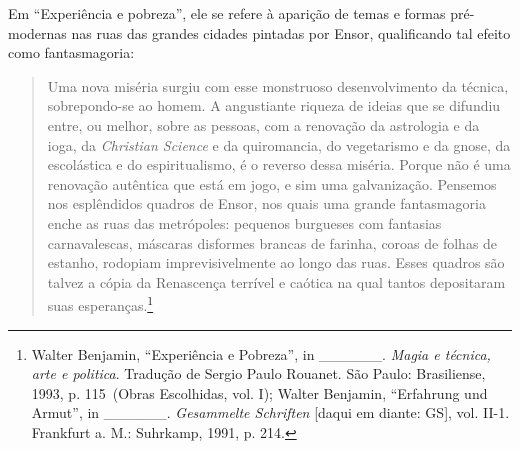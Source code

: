 Em ``Experiência e pobreza'', ele se refere à aparição de temas e formas
pré-modernas nas ruas das grandes cidades pintadas por Ensor,
qualificando tal efeito como fantasmagoria:

\begin{quote}
Uma nova miséria surgiu com esse monstruoso desenvolvimento da técnica,
sobrepondo-se ao homem. A angustiante riqueza de ideias que se difundiu
entre, ou melhor, sobre as pessoas, com a renovação da astrologia e da
ioga, da \emph{Christian Science} e da quiromancia, do vegetarismo e da
gnose, da escolástica e do espiritualismo, é o reverso dessa miséria.
Porque não é uma renovação autêntica que está em jogo, e sim uma
galvanização. Pensemos nos esplêndidos quadros de Ensor, nos quais uma
grande fantasmagoria enche as ruas das metrópoles: pequenos burgueses
com fantasias carnavalescas, máscaras disformes brancas de farinha,
coroas de folhas de estanho, rodopiam imprevisivelmente ao longo das
ruas. Esses quadros são talvez a cópia da Renascença terrível e caótica
na qual tantos depositaram suas esperanças.\footnote{Walter Benjamin,
  ``Experiência e Pobreza'', in \_\_\_\_\_\_. \emph{Magia e técnica,
  arte e politica}. Tradução de Sergio Paulo Rouanet. São Paulo:
  Brasiliense, 1993, p. 115~(Obras Escolhidas, vol. I); Walter Benjamin,
  ``Erfahrung und Armut'', in \_\_\_\_\_\_. \emph{Gesammelte Schriften}
  {[}daqui em diante: GS{]}, vol. II-1. Frankfurt a. M.: Suhrkamp, 1991,
  p. 214.}
\end{quote}

